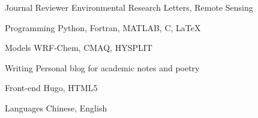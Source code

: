 
\begin{cvskills}

  \cvskill
    {Journal Reviewer} %
    {Environmental Research Letters, Remote Sensing} %

  \cvskill
    {Programming} %
    {Python, Fortran, MATLAB, C, \LaTeX} %

  \cvskill
    {Models} %
    {WRF-Chem, CMAQ, HYSPLIT} %

  \cvskill
    {Writing} %
    {Personal blog for academic notes and poetry} %

  \cvskill
    {Front-end} %
    {Hugo, HTML5} %

  \cvskill
    {Languages} %
    {Chinese, English} %

\end{cvskills}
